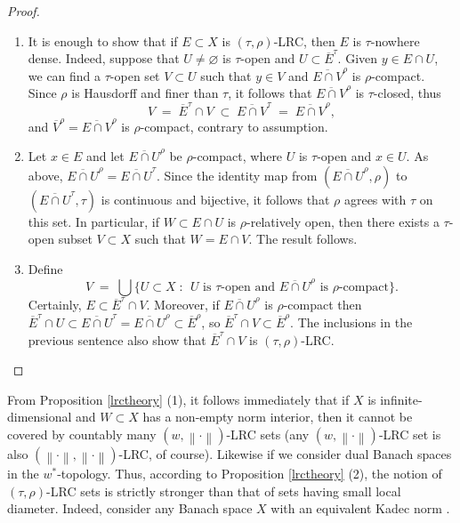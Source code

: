 \documentclass[12pt,a4paper]{amsart}
\theoremstyle{definition}
\theoremstyle{remark}
\newcommand{\cl}[1]{\ensuremath{\overline{{#1}}}}
\newcommand{\ndot}{\ensuremath{\left\|\cdot\right\|}}
\newcommand{\set}[2]{\{{#1} \;:\;\, {#2}\}}
\begin{document}
\begin{proof}$\;$
\begin{enumerate}
\item It is enough to show that if $E\subset X$ is $(\tau,\rho)$-LRC,
then $E$ is $\tau$-nowhere dense. Indeed, suppose that $U\neq\varnothing$
is $\tau$-open and $U \subset \cl{E}^\tau$.
Given $y \in E \cap U$, we can find a $\tau$-open set $V \subset U$ such that
$y \in V$ and $\cl{E \cap V}^{\rho}$ is $\rho$-compact. Since
$\rho$ is Hausdorff and finer than $\tau$, it follows that $\cl{E \cap V}^{\rho}$
is $\tau$-closed, thus
\[
V \;=\; \cl{E}^\tau \cap V \;\subset\; \cl{E \cap V}^\tau \;=\; \cl{E \cap V}^\rho,
\]
and $\cl{V}^\rho = \cl{E \cap V}^\rho$ is $\rho$-compact, contrary to assumption.
\item Let $x \in E$ and let $\cl{E \cap U}^\rho$ be $\rho$-compact, where
$U$ is $\tau$-open and $x \in U$. As above, $\cl{E \cap U}^\rho = \cl{E \cap U}^\tau$.
Since the identity map from $(\cl{E \cap U}^\rho,\rho)$ to $(\cl{E \cap U}^\tau,\tau)$
is continuous and bijective, it follows that $\rho$ agrees with $\tau$ on this set.
In particular, if $W \subset E \cap U$ is $\rho$-relatively open, then there exists
a $\tau$-open subset $V \subset X$ such that $W = E \cap V$. The result follows.
\item Define
\[
V \;=\; \bigcup\set{U \subset X}{\text{$U$ is $\tau$-open
and $\cl{E \cap U}^\rho$ is $\rho$-compact}}.
\]
Certainly, $E \subset \cl{E}^{\tau} \cap V$. Moreover,
if $\cl{E \cap U}^\rho$ is $\rho$-compact then
$\cl{E}^{\tau} \cap U \subset \cl{E \cap
U}^{\tau} =  \cl{E \cap U}^{\rho} \subset
\cl{E}^{\rho}$, so $\cl{E}^{\tau} \cap V
\subset \cl{E}^{\rho}$. The inclusions in the previous
sentence also show that $\cl{E}^{\tau} \cap V$ is
$(\tau,\rho)$-LRC. \qedhere
\end{enumerate}
\end{proof}

From Proposition \ref{lrctheory} (1), it follows immediately that if
$X$ is infinite-dimensional and $W \subset X$ has a non-empty norm
interior, then it cannot be covered by countably many
$(w,\ndot)$-LRC sets (any $(w,\ndot)$-LRC set is also
$(\ndot,\ndot)$-LRC, of course). Likewise if we consider dual Banach
spaces in the $w^*$-topology. Thus, according to Proposition
\ref{lrctheory} (2), the notion of $(\tau,\rho)$-LRC sets is
strictly stronger than that of sets having small local diameter. Indeed,
consider any Banach space $X$ with an equivalent Kadec norm
\cite[Theorem 2.1]{jnr:92}.
\end{document}
